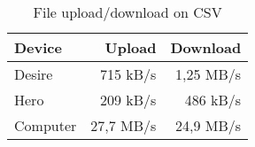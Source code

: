 \begin{table}
  \centering
  \caption{File upload/download on CSV}
  \begin{tabular}{ | l | r | r |}
    \hline
    \textbf{Device}    &   \textbf{Upload}  &   \textbf{Download}   \\ \hline
    Desire   &   715 kB/s & 1,25 MB/s   \\ \hline                
    Hero     &   209 kB/s & 486 kB/s    \\ \hline 
    Computer &  27,7 MB/s & 24,9 MB/s \\ \hline
  \end{tabular}
  \label{tbl:files:encrypted}
\end{table}
